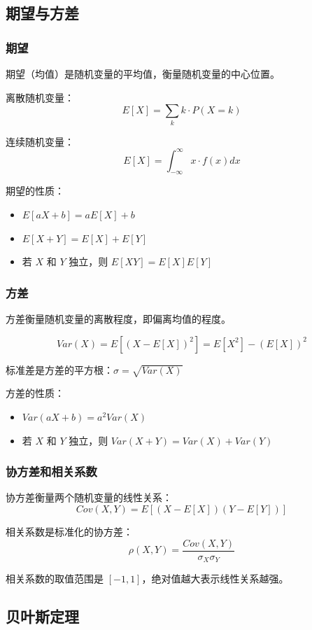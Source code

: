 \documentclass[12pt,UTF8]{ctexbook}
\begin{document}
\subsection{期望与方差}

\subsubsection{期望}

期望（均值）是随机变量的平均值，衡量随机变量的中心位置。

离散随机变量：
$$E[X] = \sum_{k} k \cdot P(X=k)$$

连续随机变量：
$$E[X] = \int_{-\infty}^{\infty} x \cdot f(x) dx$$

期望的性质：
\begin{itemize}[leftmargin=2cm]
    \item $E[aX + b] = aE[X] + b$
    \item $E[X + Y] = E[X] + E[Y]$
    \item 若 $X$ 和 $Y$ 独立，则 $E[XY] = E[X]E[Y]$
\end{itemize}

\subsubsection{方差}

方差衡量随机变量的离散程度，即偏离均值的程度。

$$Var(X) = E[(X - E[X])^2] = E[X^2] - (E[X])^2$$

标准差是方差的平方根：$\sigma = \sqrt{Var(X)}$

方差的性质：
\begin{itemize}[leftmargin=2cm]
    \item $Var(aX + b) = a^2 Var(X)$
    \item 若 $X$ 和 $Y$ 独立，则 $Var(X + Y) = Var(X) + Var(Y)$
\end{itemize}

\subsubsection{协方差和相关系数}

协方差衡量两个随机变量的线性关系：
$$Cov(X, Y) = E[(X - E[X])(Y - E[Y])]$$

相关系数是标准化的协方差：
$$\rho(X, Y) = \frac{Cov(X, Y)}{\sigma_X \sigma_Y}$$

相关系数的取值范围是 $[-1, 1]$，绝对值越大表示线性关系越强。

\subsection{贝叶斯定理}
\end{document}
